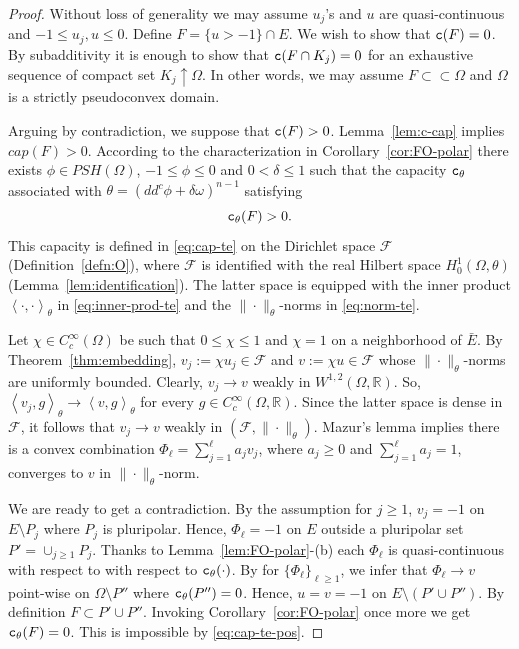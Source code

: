 \documentclass{amsart}
\newcommand{\lc}{\left<}
\newcommand{\rc}{\right>}
\newcommand{\de}{\delta}
\newcommand{\om}{\omega}
\newcommand{\te}{\theta}
\newcommand{\tc}{{\tt c}}
\newcommand{\Om}{\Omega}
\newcommand{\cF}{\mathcal{F}}
\newcommand{\bR}{\mathbb{R}}
\theoremstyle{definition}
\numberwithin{thm}{section}
\numberwithin{equation}{section}
\renewcommand{\[}{\begin{equation}}
\renewcommand{\]}{\end{equation}}
\begin{document}
\begin{proof} Without loss of generality we may assume $u_j$'s and $u$ are quasi-continuous and $-1\leq u_j, u \leq 0$. Define $F= \{u>-1\} \cap E$.  We wish to show that $\tc(F)=0$. By subadditivity it is enough to show that $\tc(F \cap K_j)=0$ for an exhaustive sequence of compact set $K_j \uparrow \Om$. In other words, we may assume $F\subset \subset \Om$ and $\Om$ is a strictly pseudoconvex domain.

Arguing by contradiction,  we suppose  that $\tc (F)>0$. Lemma~\ref{lem:c-cap} implies $cap (F)>0$. According to the characterization in Corollary~\ref{cor:FO-polar} there exists $\phi \in PSH(\Om)$, $-1\leq \phi \leq 0$ and  $0<\de \leq 1$ such that the capacity $\tc_\te$ associated with $\te = (dd^c \phi + \de\om)^{n-1}$ satisfying  \[\label{eq:cap-te-pos}\tc_\te (F)>0.\] This capacity is defined in \eqref{eq:cap-te} on the Dirichlet space $\cF$ (Definition~\ref{defn:O}), where $\cF$ is identified with the real Hilbert space $H_0^1(\Om, \te)$ (Lemma~\ref{lem:identification}). The latter space is equipped with the inner product $\lc \cdot, \cdot\rc_\te$  in \eqref{eq:inner-prod-te} and  the $\|\cdot\|_\te$-norms in \eqref{eq:norm-te}.

Let $\chi \in C^\infty_c(\Om)$ be such that $0\leq \chi \leq 1$ and $\chi =1$ on a neighborhood of $\bar E$. By Theorem~\ref{thm:embedding}, $v_j:=\chi u_j \in \cF$ and $v:= \chi u\in \cF$ whose $\|\cdot\|_\te$-norms  are uniformly bounded. Clearly, $v_j \to v$  weakly in $W^{1,2}(\Om, \bR)$. So, $\lc v_j, g\rc_\te \to \lc v, g\rc_\te$ for every $g\in C^\infty_c(\Om,\bR)$. 
Since the latter space is dense in $\cF$, it follows  that $v_j \to v$ weakly in $(\cF, \|\cdot\|_\te)$.
Mazur's lemma  implies there is a convex combination $\Phi_\ell= \sum_{j=1}^\ell a_j v_j$, where $a_j \geq 0$ and $\sum_{j=1}^\ell a_j=1$, converges  to $v$ in $\|\cdot\|_\te$-norm. 

We are ready to get a contradiction. By the assumption for $j\geq 1$, $v_j =-1$ on $E\setminus P_j$ where $P_j$ is pluripolar. Hence, $\Phi_\ell =-1$ on $E$ outside a pluripolar set $P'=
\cup_{j\geq 1} P_j$.
Thanks to Lemma~\ref{lem:FO-polar}-(b) each $\Phi_\ell$ is quasi-continuous with respect to  with respect to $\tc_\te(\cdot)$. By \cite[Theorem~2.1.4]{FOT94} for $\{\Phi_\ell\}_{\ell\geq 1}$, we infer that $\Phi_\ell \to v$ point-wise on $\Om\setminus P''$ where $\tc_\te(P'') =0$. 
Hence, $u=v=-1$ on $E\setminus ( P' \cup P'')$. By definition  $F \subset P' \cup P''$. Invoking Corollary~\ref{cor:FO-polar} once more we get  $\tc_\te(F) =0$. This is impossible by \eqref{eq:cap-te-pos}. 
\end{proof}
\end{document}
